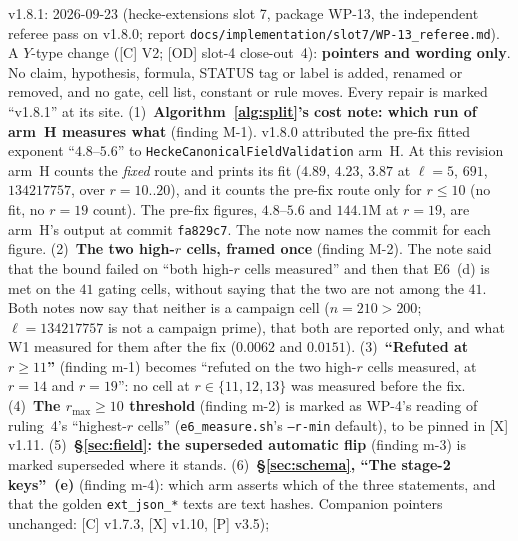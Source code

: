 \documentclass[11pt]{article}
\theoremstyle{remark}
\begin{document}
v1.8.1: 2026-09-23 (hecke-extensions slot 7, package WP-13, the independent
referee pass on v1.8.0; report \texttt{docs/implementation/slot7/WP-13\_referee.md}). A $Y$-type
change ([C] V2; [OD] slot-4 close-out~4): \textbf{pointers and wording only}. No claim,
hypothesis, formula, STATUS tag or label is added, renamed or removed, and no gate, cell list,
constant or rule moves. Every repair is marked ``v1.8.1'' at its site.
(1)~\textbf{Algorithm~\ref{alg:split}'s cost note: which run of arm~H measures what} (finding
M-1). v1.8.0 attributed the pre-fix fitted exponent ``$4.8$--$5.6$'' to
\texttt{HeckeCanonicalFieldValidation} arm~H. At this revision arm~H counts the \emph{fixed}
route and prints its fit ($4.89$, $4.23$, $3.87$ at $\ell=5$, $691$, $134217757$, over
$r=10..20$), and it counts the pre-fix route only for $r\le10$ (no fit, no $r=19$ count). The
pre-fix figures, $4.8$--$5.6$ and $144.1$M at $r=19$, are arm~H's output at commit
\texttt{fa829c7}. The note now names the commit for each figure.
(2)~\textbf{The two high-$r$ cells, framed once} (finding M-2). The note said that the bound failed
on ``both high-$r$ cells measured'' and then that E6~(d) is met on the $41$ gating cells, without
saying that the two are not among the $41$. Both notes now say that neither is a campaign cell
($n=210>200$; $\ell=134217757$ is not a campaign prime), that both are reported only, and what
W1 measured for them after the fix ($0.0062$ and $0.0151$).
(3)~\textbf{``Refuted at $r\ge11$''} (finding m-1) becomes ``refuted on the two high-$r$ cells
measured, at $r=14$ and $r=19$'': no cell at $r\in\{11,12,13\}$ was measured before the fix.
(4)~\textbf{The $r_{\max}\ge10$ threshold} (finding m-2) is marked as WP-4's reading of ruling~4's
``highest-$r$ cells'' (\texttt{e6\_measure.sh}'s \texttt{--r-min} default), to be pinned in [X]
v1.11.
(5)~\textbf{\S\ref{sec:field}: the superseded automatic flip} (finding m-3) is marked
superseded where it stands.
(6)~\textbf{\S\ref{sec:schema}, ``The stage-2 keys''~(e)} (finding m-4): which arm asserts which
of the three statements, and that the golden \texttt{ext\_json\_*} texts are text hashes.
Companion pointers unchanged: [C] v1.7.3, [X] v1.10, [P] v3.5);
\end{document}
